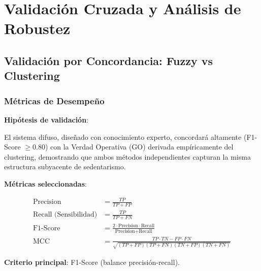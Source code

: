 \documentclass[12pt,letterpaper,twoside]{report}
\begin{document}
\chapter{Validación Cruzada y Análisis de Robustez}

\section{Validación por Concordancia: Fuzzy vs Clustering}

\subsection{Métricas de Desempeño}

\begin{hipotesisbox}
\textbf{Hipótesis de validación}:

El sistema difuso, diseñado con conocimiento experto, concordará altamente (F1-Score $\geq 0.80$) con la Verdad Operativa (GO) derivada empíricamente del clustering, demostrando que ambos métodos independientes capturan la misma estructura subyacente de sedentarismo.
\end{hipotesisbox}

\begin{estadisticobox}
\textbf{Métricas seleccionadas}:

\begin{align}
\text{Precision} &= \frac{TP}{TP + FP} \\
\text{Recall (Sensibilidad)} &= \frac{TP}{TP + FN} \\
\text{F1-Score} &= \frac{2 \cdot \text{Precision} \cdot \text{Recall}}{\text{Precision} + \text{Recall}} \\
\text{MCC} &= \frac{TP \cdot TN - FP \cdot FN}{\sqrt{(TP+FP)(TP+FN)(TN+FP)(TN+FN)}}
\end{align}

\textbf{Criterio principal}: F1-Score (balance precisión-recall).
\end{estadisticobox}
\end{document}
